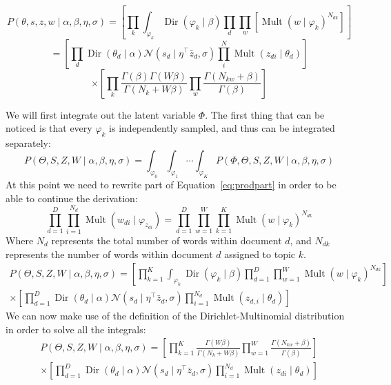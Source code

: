 \documentclass[a4paper,10pt]{article}
\DeclareMathOperator{\Dir}{Dir}
\DeclareMathOperator{\Mult}{Mult}
\renewcommand{\phi}{\varphi}
\begin{document}
\[P(\theta, s, z, w \mid \alpha, \beta, \eta, \sigma) = \left[ \prod_k \int_{\phi_k} \Dir(\phi_k \mid \beta) \prod_d \prod_w \left[ \Mult(w \mid \phi_k)^{N_{dk}}\right] \right]\]
\[ = \left[ \prod_d \Dir(\theta_d \mid \alpha) \mathcal{N}(s_d \mid \eta^\top \bar{z}_d, \sigma) \prod_i^N \Mult(z_{di} \mid \theta_d) \right]\]
\[\times \left[ \prod_k \frac{\Gamma(\beta) \Gamma(W\beta)}{\Gamma(N_k + W\beta)} \prod_w \frac{\Gamma(N_{kw}+\beta)}{\Gamma(\beta)}\right]\]

We will first integrate out the latent variable $\Phi$. The first thing that can be noticed is that every $\varphi_k$ is independently sampled, and thus can be integrated separately:
\begin{equation}
P(\Theta, S, Z, W \mid \alpha, \beta, \eta, \sigma) = \int_{\phi_0}\int_{\phi_1}\cdots \int_{\phi_K} P(\Phi, \Theta, S, Z, W \mid \alpha, \beta, \eta, \sigma)
\end{equation}
At this point we need to rewrite part of Equation~\ref{eq:prodpart} in order to be able to continue the derivation:
\begin{equation}
\prod_{d = 1}^D \prod_{i = 1}^{N_d} \Mult(w_{di} \mid \phi_{z_{di}}) = \prod_{d = 1}^D \prod_{w = 1}^W \prod_{k = 1}^K \Mult(w \mid \phi_k)^{N_{dk}}
\end{equation}
Where $N_d$ represents the total number of words within document $d$, and $N_{dk}$ represents the number of words within document $d$ assigned to topic $k$.
\begin{equation}
\begin{gathered}
P(\Theta, S, Z, W \mid \alpha, \beta, \eta, \sigma) = \left[ \prod_{k = 1}^K \int_{\phi_k} \Dir(\phi_k \mid \beta) \prod_{d = 1}^D \prod_{w = 1}^W \Mult(w \mid \phi_k)^{N_{dk}} \right]  \\
\times\left[ \prod_{d = 1}^D \Dir(\theta_d \mid \alpha) \mathcal{N}(s_d \mid \eta^\top \bar{z}_d, \sigma) \prod_{i = 1}^{N_d} \Mult(z_{d, i} \mid \theta_d) \right]
\end{gathered}
\end{equation}
We can now make use of the definition of the Dirichlet-Multinomial distribution in order to solve all the integrals:
\begin{equation}
\begin{gathered}
P(\Theta, S, Z, W \mid \alpha, \beta, \eta, \sigma) = \left[ \prod_{k = 1}^K \frac{ \Gamma(W\beta)}{\Gamma(N_k + W\beta)} \prod_{w = 1}^W \frac{\Gamma(N_{kw}+\beta)}{\Gamma(\beta)}\right]\\
\times\left[ \prod_{d = 1}^D \Dir(\theta_d \mid \alpha) \mathcal{N}(s_d \mid \eta^\top \bar{z}_d, \sigma) \prod_{i = 1}^{N_d} \Mult(z_{di} \mid \theta_d) \right]
\end{gathered}
\end{equation}
\end{document}
